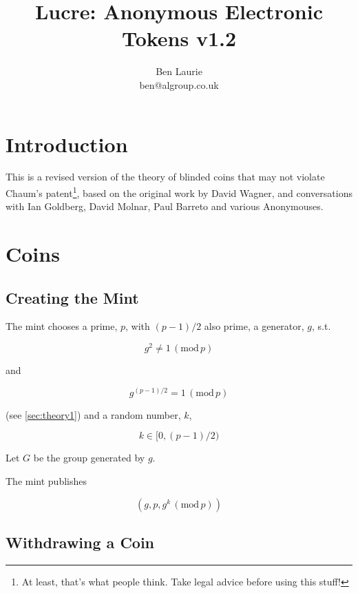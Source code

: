\documentclass[a4paper,titlepage]{article}
\title{Lucre: Anonymous Electronic Tokens v1.2}
\author{Ben Laurie \\
ben@algroup.co.uk}
\begin{document}
\maketitle

\def\mod#1{\,(\textrm{mod}\,#1)}
\def\implies{\Rightarrow}
\def\qe#1{\begin{equation}#1\end{equation}}
\def\qearray#1{\begin{eqnarray}#1\end{eqnarray}}
\def\oneway#1{\textrm{oneway}(#1)}
\def\preoneway#1{\textrm{preoneway}(#1)}

\setlength{\parindent}{0pt}
\setlength{\parskip}{1ex plus 0.5ex minus 0.2ex}

\section{Introduction}

This is a revised version of the theory of blinded coins that may not
violate Chaum's patent\footnote{At least, that's what people
think. Take legal advice before using this stuff!}, based on the
original work by David Wagner, and conversations with Ian Goldberg,
David Molnar, Paul Barreto and various Anonymouses.

\section{Coins}

\subsection{Creating the Mint}

The mint chooses a prime, $p$, with $(p-1)/2$ also prime, a generator,
$g$, s.t.

\qe{g^2 \neq 1 \mod p}

and

\qe{\label{eq:1}g^{(p-1)/2} = 1 \mod p}

(see \ref{sec:theory1}) and a random number, $k$,

\qe{k \in [0,(p-1)/2)}

Let $G$ be the group generated by $g$.

The mint publishes

\qe{(g,p,g^k \mod p)}

\subsection{Withdrawing a Coin}
\end{document}
